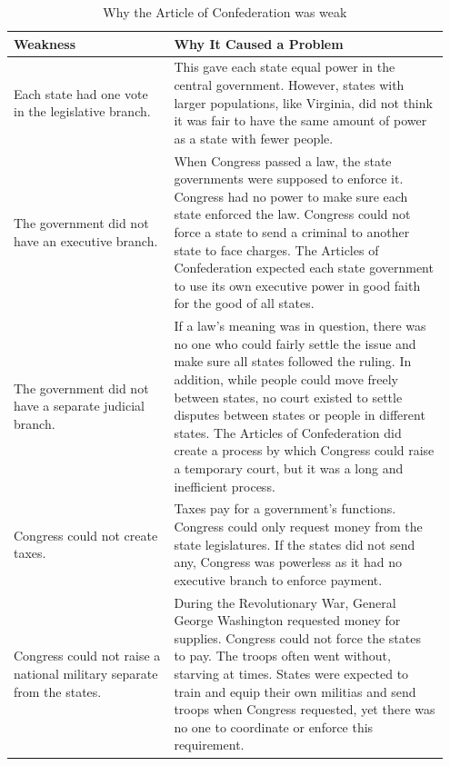 \begin{center}
	\begin{table}[htbp]
		\begin{tabular}{ p{0.35\linewidth} | p{0.6\linewidth} } 
			\hline
			Weakness  & Why It Caused a Problem \\
			\hline
			Each state had one vote in the legislative branch. & This gave each state
			equal power in the central government. However, states with larger
			populations, like Virginia, did not think it was fair to have the same
			amount of power as a state with fewer people. \\ \hline
			The government did not have an executive branch. & When Congress passed a
			law, the state governments were supposed to enforce it. Congress had no
			power to make sure each state enforced the law. Congress could not force
			a state to send a criminal to another state to face charges. The Articles
			of Confederation expected each state government to use its own executive
			power in good faith for the good of all states. \\ \hline
			The government did not have a separate judicial branch. & If a law's
			meaning was in question, there was no one who could fairly settle the
			issue and make sure all states followed the ruling. In addition, while
			people could move freely between states, no court existed to settle
			disputes between states or people in different states. The Articles of
			Confederation did create a process by which Congress could raise a
			temporary court, but it was a long and inefficient process. \\ \hline
			Congress could not create taxes. & Taxes pay for a government's
			functions. Congress could only request money from the state legislatures.
			If the states did not send any, Congress was powerless as it had no
			executive branch to enforce payment. \\ \hline
			Congress could not raise a national military separate from the states. &
			During the Revolutionary War, General George Washington requested money
			for supplies. Congress could not force the states to pay. The troops
			often went without, starving at times. States were expected to train and
			equip their own militias and send troops when Congress requested, yet
			there was no one to coordinate or enforce this requirement. \\ \hline
		\end{tabular}

		\caption{Why the Article of Confederation was weak}
		\label{table:why-was-the-article-of-confederation-was-weak}
	\end{table}
\end{center}

